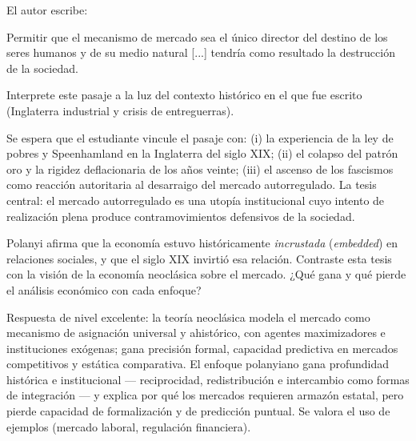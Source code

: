\documentclass{academic-exam}
\begin{document}
\begin{pregunta}
El autor escribe:
\begin{displayquote}
  Permitir que el mecanismo de mercado sea el único director del destino
  de los seres humanos y de su medio natural [...] tendría como resultado
  la destrucción de la sociedad.
\end{displayquote}
Interprete este pasaje a la luz del contexto histórico en el que fue
escrito (Inglaterra industrial y crisis de entreguerras).
\begin{solucion}
Se espera que el estudiante vincule el pasaje con: (i) la experiencia de
la ley de pobres y Speenhamland en la Inglaterra del siglo XIX;
(ii) el colapso del patrón oro y la rigidez deflacionaria de los años
veinte; (iii) el ascenso de los fascismos como reacción autoritaria al
desarraigo del mercado autorregulado. La tesis central: el mercado
autorregulado es una utopía institucional cuyo intento de realización
plena produce contramovimientos defensivos de la sociedad.
\end{solucion}
\end{pregunta}

\begin{pregunta}
Polanyi afirma que la economía estuvo históricamente \emph{incrustada}
(\emph{embedded}) en relaciones sociales, y que el siglo XIX invirtió esa
relación. Contraste esta tesis con la visión de la economía neoclásica
sobre el mercado. ¿Qué gana y qué pierde el análisis económico con cada
enfoque?
\begin{solucion}
Respuesta de nivel excelente: la teoría neoclásica modela el mercado como
mecanismo de asignación universal y ahistórico, con agentes maximizadores
e instituciones exógenas; gana precisión formal, capacidad predictiva en
mercados competitivos y estática comparativa. El enfoque polanyiano gana
profundidad histórica e institucional — reciprocidad, redistribución e
intercambio como formas de integración — y explica por qué los mercados
requieren armazón estatal, pero pierde capacidad de formalización y de
predicción puntual. Se valora el uso de ejemplos (mercado laboral,
regulación financiera).
\end{solucion}
\end{pregunta}
\end{document}
